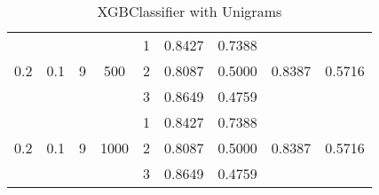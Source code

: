 \documentclass[12pt, twoside]{article}
\begin{document}
\begin{landscape}
\begin{table}[!htbp]
\begin{tabular}{ccccccccc}
  	\cmidrule(r){5-9}
  	&	&	&	&	1	&	0.8427	&	0.7388	&		&	 \\
  0.2	&	0.1	&	9	&	500	&	2	&	0.8087	&	0.5000	&	0.8387	&	0.5716 \\
  	&	&	&	&	3	&	0.8649	&	0.4759	&		&	 \\
  	\cmidrule(r){5-9}
  	&	&	&	&	1	&	0.8427	&	0.7388	&		&	 \\
  0.2	&	0.1	&	9	&	1000	&	2	&	0.8087	&	0.5000	&	0.8387	&	0.5716 \\
  	&	&	&	&	3	&	0.8649	&	0.4759	&		&	 \\
  \bottomrule
  \end{tabular}
  \caption{XGBClassifier with Unigrams}
\end{table}
\end{landscape}

\newpage
\end{document}
